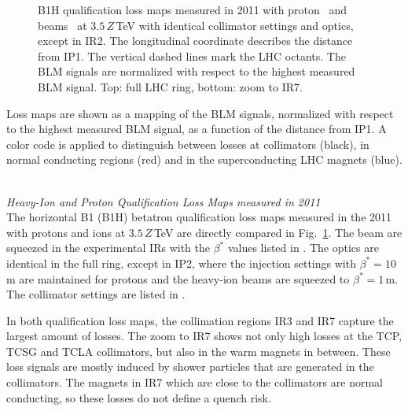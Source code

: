 \begin{figure}[htbp]
\begin{tikzpicture}
  \end{tikzpicture}
  \caption{B1H qualification loss maps measured in 2011 with proton~\cite{Bruce2014a} and \lead beams~\cite{phermes_hb2014} at $3.5\,Z\,$TeV with identical collimator settings and optics, except in IR2. The longitudinal coordinate describes the distance from IP1. The vertical dashed lines mark the LHC octants. The BLM signals are normalized with respect to the highest measured BLM signal. Top: full LHC ring, bottom: zoom to IR7. }  
  \label{fig:meas_lm_comparison}
  \end{figure}


Loss maps are shown as a mapping of the BLM signals, normalized with respect to the highest measured BLM signal, as a function of the distance from IP1. A color code is applied to distinguish between losses at collimators (black), in normal conducting regions (red) and in the superconducting LHC magnets (blue). 

\mbox{} \\ 
\textit{Heavy-Ion and Proton Qualification Loss Maps measured in 2011} \\ 

The horizontal B1 (B1H) betatron qualification loss maps measured in the 2011 with protons and \lead ions at  $3.5\,Z\,$TeV are directly compared in Fig.~\ref{fig:meas_lm_comparison}. The beam are squeezed in the experimental IRs with the $\beta^*$ values listed in . The optics are identical in the full ring, except in IP2, where the injection settings with $\beta^*=10\,$m are maintained for protons and the heavy-ion beams are squeezed to $\beta^*=1\,$m. The collimator settings are listed in .  

In both qualification loss maps, the collimation regions IR3 and IR7 capture the largest amount of losses. The zoom to IR7 shows not only high losses at the TCP, TCSG and TCLA collimators, but also in the warm magnets in between. These loss signals are mostly induced by shower particles that are generated in the collimators. The magnets in IR7 which are close to the collimators are normal conducting, so these losses do not define a quench risk. 

